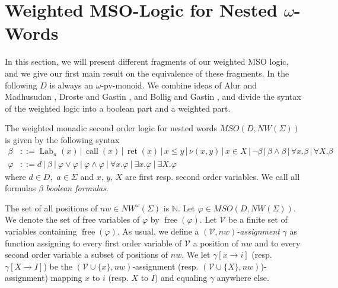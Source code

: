 \documentclass[runningheads, envcountsame, a4paper]{llncs}
\DeclareMathOperator{\free}{free}
\DeclareMathOperator{\call}{call}
\DeclareMathOperator{\ret}{ret}
\DeclareMathOperator{\Lab}{Lab}
\begin{document}
\section{Weighted MSO-Logic for Nested $\omega$-Words} \label{kapMSOD}
In this section, we will present different fragments of our weighted MSO logic, and we give our first main result on the equivalence of these fragments. 
In the following $D$ is always an $\omega$-pv-monoid. We combine ideas of Alur and Madhusudan \cite{AM}, Droste and Gastin \cite{DG}, and Bollig and Gastin \cite{BG}, 
and divide the syntax of the weighted logic into a boolean part and a weighted part.
\begin{Def}[Syntax]
	The weighted monadic second order logic for nested words $\mathit{MSO}(D, \mathit{NW}(\Sigma))$ is given by the following syntax
	\begin{align*}
\beta&::=\Lab_a(x)\, |\, \call(x)\, |\, \ret(x)\, |\, x \le y\, |\, \nu(x,y)\, |\, x \in X\, |\, \neg \beta\, |\, \beta \wedge \beta\, |\, \forall x. \beta\, |\, \forall X. \beta \\
\varphi&::=d~|~\beta~|~\varphi \vee \varphi~|~\varphi \wedge \varphi~|~\forall x. \varphi~|~\exists x. \varphi~|~\exists X. \varphi
	\end{align*}
where $d \in D$,~$a \in \Sigma$ and $x$, $y$, $X$ are first resp. second order variables. We call all formulas $\beta$ \emph{boolean formulas}.
\end{Def}
The set of all positions of $\mathit{nw} \in \mathit{NW^\omega}(\Sigma)$ is $\mathbb{N}$. Let $\varphi \in \mathit{MSO}(D, \mathit{NW}(\Sigma))$. We denote the set of free variables of $\varphi$ by $\free(\varphi)$. Let $\mathcal{V}$ be a finite set of variables containing $\free(\varphi)$. As usual, we define a \emph{$(\mathcal{V}, \mathit{nw})$-assignment} $\gamma$ as function assigning to every first order variable of $\mathcal{V}$ a position of $\mathit{nw}$ and to every second order variable a subset of positions of $\mathit{nw}$.
We let
$\gamma[x \rightarrow i]$ (resp. $\gamma[X \rightarrow I]$) be the $(\mathcal{V}\cup \{x\}, \mathit{nw})$-assignment (resp. $(\mathcal{V}\cup \{X\}, \mathit{nw})$)-assignment) mapping $x$ to $i$ (resp. $X$ to $I$) and equaling $\gamma$ anywhere else. \par
\end{document}
